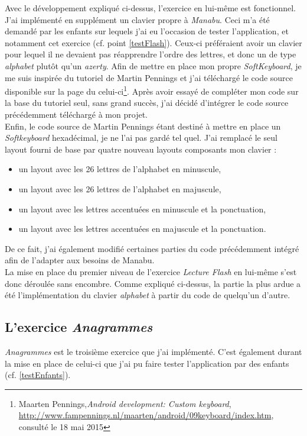 Avec le développement expliqué ci-dessus, l'exercice en lui-même est fonctionnel. J'ai implémenté en supplément un clavier propre à \textit{Manabu}\label{clavier}. Ceci m'a été demandé par les enfants sur lequels j'ai eu l'occasion de tester l'application, et notamment cet exercice (cf. point \ref{testFlash}). Ceux-ci préféraient avoir un clavier pour lequel il ne devaient pas réapprendre l'ordre des lettres, et donc un de type \textit{alphabet} plutôt qu'un \textit{azerty}. Afin de mettre en place mon propre \textit{SoftKeyboard}, je me suis inspirée du tutoriel de Martin Pennings et j'ai téléchargé le code source disponible sur la page du celui-ci\footnote{Maarten Pennings,\textit{Android development: Custom keyboard}, \url{http://www.fampennings.nl/maarten/android/09keyboard/index.htm}, consulté le 18 mai 2015}. Après avoir essayé de compléter mon code sur la base du tutoriel seul, sans grand succès, j'ai décidé d'intégrer le code source précédemment téléchargé à mon projet.\\

Enfin, le code source de Martin Pennings étant destiné à mettre en place un \textit{Softkeyboard} hexadécimal, je ne l'ai pas gardé tel quel. J'ai remplacé le seul layout fourni de base par quatre nouveau layouts composants mon clavier :
\begin{itemize}
\item un layout avec les 26 lettres de l'alphabet en minuscule,
\item un layout avec les 26 lettres de l'alphabet en majuscule,
\item un layout avec les lettres accentuées en minuscule et la ponctuation,
\item un layout avec les lettres accentuées en majuscule et la ponctuation.
\end{itemize}
De ce fait, j'ai également modifié certaines parties du code précédemment intégré afin de l'adapter aux besoins de Manabu.\\

La mise en place du premier niveau de l'exercice \textit{Lecture Flash} en lui-même s'est donc déroulée sans encombre. Comme expliqué ci-dessus, la partie la plus ardue a été l'implémentation du clavier \textit{alphabet} à partir du code de quelqu'un d'autre.
	
\subsection{L'exercice \textit{Anagrammes}}
\textit{Anagrammes} est le troisième exercice que j'ai implémenté. C'est également durant la mise en place de celui-ci que j'ai pu faire tester l'application par des enfants (cf. \ref{testEnfants}).\\

